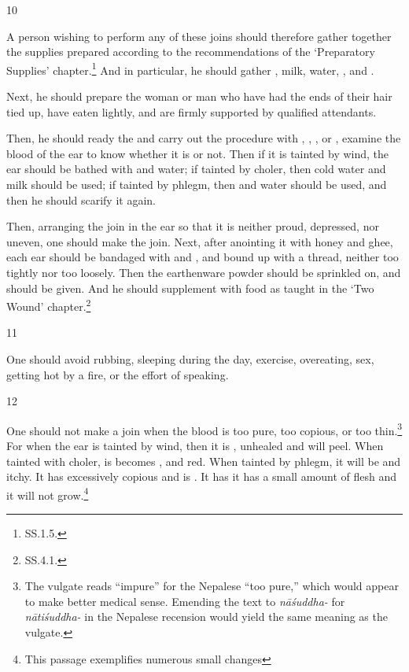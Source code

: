 \begin{translation}
    \item[10]  
    
    A person wishing to perform any of these joins should therefore gather together the
    supplies prepared according to the recommendations of the `Preparatory
    Supplies' chapter.\footnote{SS.1.5.}  And in particular, he should gather
    , milk, water,
    , and .  
    
    Next, he should prepare the woman or man who have had the ends of their hair tied 
    up, have eaten lightly, and are firmly supported by qualified 
    attendants.
    
    Then, he should ready the  and carry out the procedure with
    , , , or
    , examine the blood of the ear to know whether it is 
     or not.  Then if it is tainted by wind, the ear should be
    bathed with  and water; if tainted by choler, 
    then cold water
    and milk should be used; if tainted by phlegm, then  and water
    should be used, and then he should scarify it again.
    
    
    Then, arranging the join in the ear so that it is neither proud, depressed, nor
    uneven, one should make the join. Next, after anointing it with honey and ghee,
    each ear should be bandaged with  and , and
    bound up with a thread, neither too tightly nor too loosely.  Then the earthenware
    powder should be sprinkled on, and  should be given.
    And he should supplement with food as taught in  the `Two Wound'
    chapter.\footnote{SS.4.1.}
    
    \item[11]
    \begin{sloka}
        One should avoid rubbing, sleeping during the day, exercise, overeating,
        sex, getting hot by a fire, or the effort of speaking.
    \end{sloka}
    
    \item[12]
    
    One should not make a join when the blood is too pure, too copious, or too
    thin.\footnote{The vulgate reads “impure” for the Nepalese “too pure,” which would
    appear to make better medical sense.  Emending the text to \emph{nāśuddha-} for
    \emph{nātiśuddha-} in the Nepalese recension would yield the same meaning as the
    vulgate.} For when the ear is tainted by wind, then it is
    , unhealed and will peel. When tainted with
    choler, is becomes ,  and red.  When tainted
    by phlegm, it will be  and itchy.  It has excessively copious
     and is .  It has it has a small
    amount of  flesh and it will not grow.\footnote{This passage
    exemplifies numerous small changes }
    

\end{translation}
